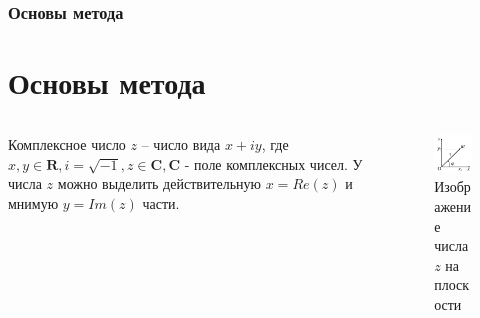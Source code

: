 \documentclass{beamer}
\newcommand\frametitleSpec[1]{%
\frametitle{#1}
\section{#1}%
}
\begin{document}
\begin{frame}
    \frametitleSpec{Основы метода}
    \begin{columns}
        \begin{column}{0.5\textwidth}
            Комплексное число \(z\) -- число вида $x + iy$, где $x,y \in \mathbf{R}, i = \sqrt{-1},z \in \mathbf{C}, \mathbf{C}$ - поле комплексных чисел. У числа \(z\) можно выделить действительную $x = Re(z)$ и мнимую $y=Im(z)$ части.
        \end{column}
        \begin{column}{0.5\textwidth}
            \begin{figure}
                \centering
                \includegraphics[width=1\textwidth]{images/img1}
                \caption{Изображение числа \(z\) на плоскости}
                \label{img1}
            \end{figure}
        \end{column}
    \end{columns}
\end{frame}
\end{document}
